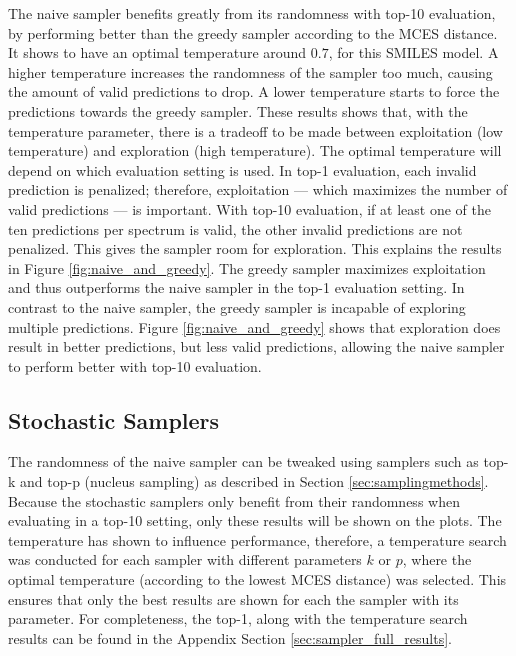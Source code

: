 The naive sampler benefits greatly from its randomness with top-10 evaluation, by performing better than the greedy sampler according to the MCES distance.
It shows to have an optimal temperature around $0.7$, for this SMILES model.
A higher temperature increases the randomness of the sampler too much, causing the amount of valid predictions to drop.
A lower temperature starts to force the predictions towards the greedy sampler.
These results shows that, with the temperature parameter, there is a tradeoff to be made between exploitation (low temperature) and exploration (high temperature).
The optimal temperature will depend on which evaluation setting is used.
In top-1 evaluation, each invalid prediction is penalized; therefore, exploitation — which maximizes the number of valid predictions — is important.
With top-10 evaluation, if at least one of the ten predictions per spectrum is valid, the other invalid predictions are not penalized. This gives the sampler room for exploration.
This explains the results in Figure \ref{fig:naive_and_greedy}.
The greedy sampler maximizes exploitation and thus outperforms the naive sampler in the top-1 evaluation setting.
In contrast to the naive sampler, the greedy sampler is incapable of exploring multiple predictions.
Figure \ref{fig:naive_and_greedy} shows that exploration does result in better predictions, but less valid predictions, allowing the naive sampler to perform better with top-10 evaluation.

\subsection{Stochastic Samplers}

The randomness of the naive sampler can be tweaked using samplers such as top-k and top-p (nucleus sampling) as described in Section \ref{sec:samplingmethods}.
Because the stochastic samplers only benefit from their randomness when evaluating in a top-10 setting, only these results will be shown on the plots.
The temperature has shown to influence performance, therefore, a temperature search was conducted for each sampler with different parameters $k$ or $p$, where the optimal temperature (according to the lowest MCES distance) was selected.
This ensures that only the best results are shown for each the sampler with its parameter.
For completeness, the top-1, along with the temperature search results can be found in the Appendix Section \ref{sec:sampler_full_results}.

